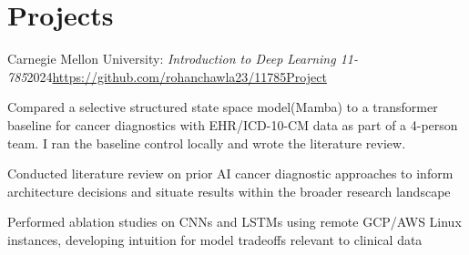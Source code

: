 \vspace{-5.5mm}
\section*{\textbf{Projects}}
    
    \resumeItemListStart
        \resumeJob
          {Carnegie Mellon University: \textit{Introduction to Deep Learning 11-785}}{2024}{{\normalfont\textcolor{blue}{{\url{https://github.com/rohanchawla23/11785Project}}}}}{}{}
                \vspace{-2.0mm}
      \item {Compared a selective structured state space model(Mamba) to a transformer baseline for cancer diagnostics with EHR/ICD-10-CM data as part of a 4-person team. I ran the baseline control locally and wrote the literature review.}
      \item{Conducted literature review on prior AI cancer diagnostic approaches to inform architecture decisions and situate results within the broader research landscape}
      \item{Performed ablation studies on CNNs and LSTMs using remote GCP/AWS Linux instances, developing intuition for model tradeoffs relevant to clinical data}
